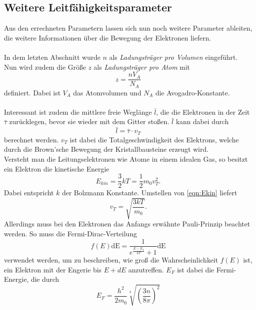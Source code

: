 \subsection{Weitere Leitfähigkeitsparameter}
Aus den errechneten Parametern lassen sich nun noch weitere Parameter ableiten, die weitere Informationen
über die Bewegung der Elektronen liefern.\\\\
In dem letzten Abschnitt wurde $n$ als \textit{Ladungsträger pro Volumen} eingeführt. Nun wird zudem die
Größe $z$ als \textit{Ladungsträger pro Atom} mit
\begin{equation}
    z=\frac{n V_{A}}{N_A}\label{eqn:z}
\end{equation}
definiert. Dabei ist $V_{A}$ das Atomvolumen und $N_A$ die Avogadro-Konstante.\\\\
Interessant ist zudem die mittlere freie Weglänge $\bar{l}$, die die Elektronen in der Zeit $\bar{\tau}$ zurücklegen, bevor
sie wieder mit dem Gitter stoßen. $\bar{l}$ kann dabei durch
\begin{equation*}
    \bar{l}=\bar{\tau}\cdot v_T
\end{equation*}
berechnet werden. $v_T$ ist dabei die Totalgeschwindigkeit des Elektrons, welche durch die Brown'sche Bewegung
der Kristallbausteine erzeugt wird.\\
Versteht man die Leitungselektronen wie Atome in einem idealen Gas, so besitzt ein Elektron die kinetische Energie
\begin{equation}
    E_{kin}=\frac{3}{2}kT=\frac{1}{2}m_0v_T^2 . \label{eqn:Ekin}
\end{equation}
Dabei entspricht $k$ der Bolzmann Konstante. Umstellen von \eqref{eqn:Ekin} liefert
\begin{equation}
    v_T=\sqrt{\frac{3kT}{m_0}}. \label{eqn:vT1}
\end{equation}
Allerdings muss bei den Elektronen das Anfangs erwähnte Pauli-Prinzip beachtet werden. So muss die Fermi-Dirac-Verteilung
\begin{equation*}
    f(E)\text{dE}=\frac{1}{e^{\frac{E-E_f}{kT}}+1}\text{dE}
\end{equation*}
verwendet werden, um zu beschreiben, wie groß die Wahrscheinlichkeit $f(E)$ ist, ein
Elektron mit der Engerie bis $E+dE$ anzutreffen. $E_F$ ist dabei die Fermi-Energie, die durch
\begin{equation}
    E_F=\frac{h^2}{2m_0}\sqrt[3]{\left(\frac{3n}{8\pi}\right)^2} \label{eqn:EF}
\end{equation}
